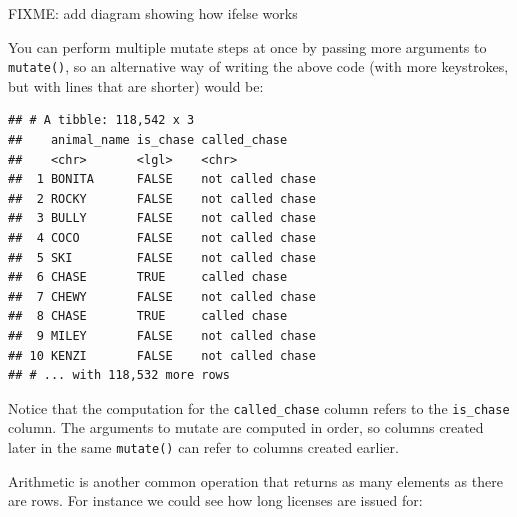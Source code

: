 \documentclass[]{Nemilov}
\newenvironment{Shaded}{\begin{snugshade}}{\end{snugshade}}
\newcommand{\DataTypeTok}[1]{\textcolor[rgb]{0.13,0.29,0.53}{#1}}
\newcommand{\KeywordTok}[1]{\textcolor[rgb]{0.13,0.29,0.53}{\textbf{#1}}}
\newcommand{\NormalTok}[1]{#1}
\newcommand{\OperatorTok}[1]{\textcolor[rgb]{0.81,0.36,0.00}{\textbf{#1}}}
\newcommand{\StringTok}[1]{\textcolor[rgb]{0.31,0.60,0.02}{#1}}
\begin{document}
FIXME: add diagram showing how ifelse works

You can perform multiple mutate steps at once by passing more arguments to \texttt{mutate()}, so an alternative way of writing the above code (with more keystrokes, but with lines that are shorter) would be:

\begin{Shaded}
\end{Shaded}

\begin{verbatim}
## # A tibble: 118,542 x 3
##    animal_name is_chase called_chase    
##    <chr>       <lgl>    <chr>           
##  1 BONITA      FALSE    not called chase
##  2 ROCKY       FALSE    not called chase
##  3 BULLY       FALSE    not called chase
##  4 COCO        FALSE    not called chase
##  5 SKI         FALSE    not called chase
##  6 CHASE       TRUE     called chase    
##  7 CHEWY       FALSE    not called chase
##  8 CHASE       TRUE     called chase    
##  9 MILEY       FALSE    not called chase
## 10 KENZI       FALSE    not called chase
## # ... with 118,532 more rows
\end{verbatim}

Notice that the computation for the \texttt{called\_chase} column refers to the \texttt{is\_chase} column. The arguments to mutate are computed in order, so columns created later in the same \texttt{mutate()} can refer to columns created earlier.

Arithmetic is another common operation that returns as many elements as there are rows. For instance we could see how long licenses are issued for:

\begin{Shaded}
\end{Shaded}
\end{document}
